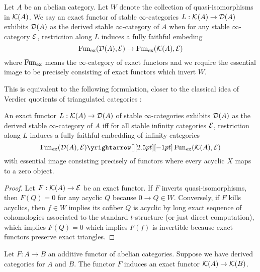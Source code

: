 \documentclass{article}
\begin{document}
\begin{dfn}\cite[Definition 1.3.4.1]{lurie-HA}
  Let $A$ be an abelian category.
  Let $W$ denote the collection of quasi-isomorphisms in $\mathcal{K}(A)$.
  We say an exact functor of stable $\infty$-categories 
  $L : \mathcal{K}(A) \to \mathcal{D}(A)$
  exhibits $\mathcal{D}(A)$ as the derived stable $\infty$-category of $A$ when
  for any stable $\infty$-category $\mathcal{E}$,
  restriction along $L$ induces a fully faithful embeding \[
    \operatorname{Fun}_{\mathrm{ex}}(\mathcal{D}(A) , \mathcal{E}) \to \operatorname{Fun}_{\mathrm{ex}}(\mathcal{K}(A) , \mathcal{E})
  \]
  where $\operatorname{Fun}_{\mathrm{ex}}$ means the $\infty$-category of exact functors
  and we require the essential image to be precisely
  consisting of exact functors which invert $W$.
\end{dfn}
This is equivalent to the following formulation,
closer to the classical idea of Verdier quotients of triangulated categories : 
\begin{prop}
  An exact functor $L : \mathcal{K}(A) \to \mathcal{D}(A)$ of stable $\infty$-categories
  exhibits $\mathcal{D}(A)$ as the derived stable $\infty$-category of $A$
  iff for all stable infinity categories $\mathcal{E}$,
  restriction along $L$ induces 
  a fully faithful embedding of infinity categories \[
    \FUN_{\mathrm{ex}}(\cD(A), \cE) \map{}{}
    \FUN_{\mathrm{ex}}(\cK(A) , \cE)
  \]
  with essential image consisting precisely of 
  functors where every acyclic $X$ maps to a zero object.
\end{prop}
\begin{proof}
  Let $F : \mathcal{K}(A) \to \mathcal{E}$ be an exact functor.
  If $F$ inverts quasi-isomorphisms,
  then $F(Q) = 0$ for any acyclic $Q$ because $0 \to Q \in W$.
  Conversely, if $F$ kills acyclics,
  then $f \in W$ implies its cofiber $Q$ is acyclic by long exact
  sequence of cohomologies associated to the standard $t$-structure 
  (or just direct computation),
  which implies $F(Q) = 0$ which implies $F(f)$ is invertible
  because exact functors preserve exact triangles.
\end{proof}
Let $F : A \to B$ an additive functor of abelian categories.
Suppose we have derived categories for $A$ and $B$.
The functor $F$ induces an exact functor $\mathcal{K}(A) \to \mathcal{K}(B)$.
\end{document}
